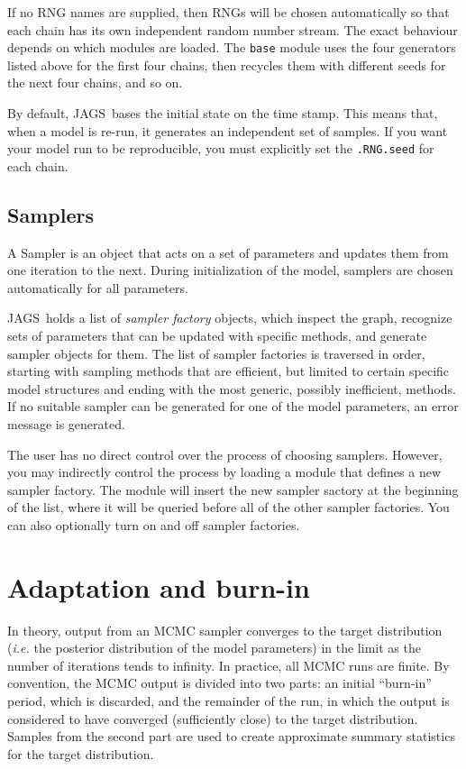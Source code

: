 \documentclass[11pt, a4paper, titlepage]{report}
\newcommand{\JAGS}{\textsf{JAGS}}
\begin{document}
If no RNG names are supplied, then RNGs will be chosen automatically
so that each chain has its own independent random number stream.  The
exact behaviour depends on which modules are loaded. The \texttt{base}
module uses the four generators listed above for the first four
chains, then recycles them with different seeds for the next four
chains, and so on.  

By default, \JAGS\ bases the initial state on the time stamp. This
means that, when a model is re-run, it generates an independent set of
samples. If you want your model run to be reproducible, you must
explicitly set the \texttt{.RNG.seed} for each chain.

\subsection{Samplers}

A Sampler is an object that acts on a set of parameters and updates
them from one iteration to the next. During initialization of the
model, samplers are chosen automatically for all parameters.

\JAGS\ holds a list of {\em sampler factory} objects, which inspect
the graph, recognize sets of parameters that can be updated with
specific methods, and generate sampler objects for them. The list of
sampler factories is traversed in order, starting with sampling
methods that are efficient, but limited to certain specific model
structures and ending with the most generic, possibly inefficient,
methods. If no suitable sampler can be generated for one of the model
parameters, an error message is generated.

The user has no direct control over the process of choosing
samplers. However, you may indirectly control the process by loading a
module that defines a new sampler factory. The module will insert the
new sampler sactory at the beginning of the list, where it will be
queried before all of the other sampler factories. You can also
optionally turn on and off sampler factories. %
 
\section{Adaptation and burn-in}

In theory, output from an MCMC sampler converges to the target
distribution ({\em i.e.} the posterior distribution of the model
parameters) in the limit as the number of iterations tends to
infinity. In practice, all MCMC runs are finite.  By convention, the
MCMC output is divided into two parts: an initial ``burn-in'' period,
which is discarded, and the remainder of the run, in which the output
is considered to have converged (sufficiently close) to the target
distribution. Samples from the second part are used to create
approximate summary statistics for the target distribution.
\end{document}
